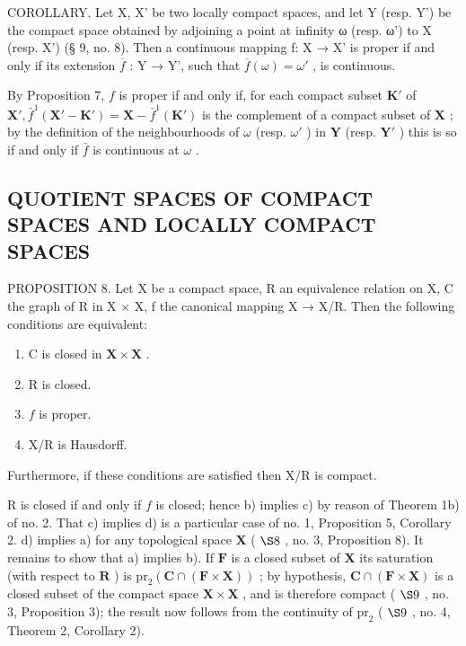 COROLLARY. Let X, X' be two locally compact spaces, and let Y (resp. Y') be the compact space obtained by adjoining a point at infinity ω (resp. ω') to X (resp. X') (§ 9, no. 8). Then a continuous mapping f: X → X' is proper if and only if its extension \(\overline{f}\) : Y → Y', such that \(\overline{f}(\omega) = \omega'\) , is continuous.

By Proposition 7, \(f\) is proper if and only if, for each compact subset \(\mathbf{K}'\) of \(\mathbf{X}', \bar{f}^1(\mathbf{X}' - \mathbf{K}') = \mathbf{X} - \bar{f}^1(\mathbf{K}')\) is the complement of a compact subset of \(\mathbf{X}\) ; by the definition of the neighbourhoods of \(\omega\) (resp. \(\omega'\) ) in \(\mathbf{Y}\) (resp. \(\mathbf{Y}'\) ) this is so if and only if \(\bar{f}\) is continuous at \(\omega\) .

\subsection{QUOTIENT SPACES OF COMPACT SPACES AND LOCALLY COMPACT SPACES}

PROPOSITION 8. Let X be a compact space, R an equivalence relation on X, C the graph of R in X × X, f the canonical mapping X → X/R. Then the following conditions are equivalent:

\begin{enumerate}
\def\labelenumi{\alph{enumi})}
\item
  C is closed in \(\mathbf{X} \times \mathbf{X}\) .
\item
  R is closed.
\item
  \(f\) is proper.
\item
  X/R is Hausdorff.
\end{enumerate}

Furthermore, if these conditions are satisfied then X/R is compact.

R is closed if and only if \(f\) is closed; hence b) implies c) by reason of Theorem 1b) of no. 2. That c) implies d) is a particular case of no. 1, Proposition 5, Corollary 2. d) implies a) for any topological space \(\mathbf{X}\) ( \(\S 8\) , no. 3, Proposition 8). It remains to show that a) implies b). If \(\mathbf{F}\) is a closed subset of \(\mathbf{X}\) its saturation (with respect to \(\mathbf{R}\) ) is \(\mathrm{pr}_2(\mathbf{C} \cap (\mathbf{F} \times \mathbf{X}))\) ; by hypothesis, \(\mathbf{C} \cap (\mathbf{F} \times \mathbf{X})\) is a closed subset of the compact space \(\mathbf{X} \times \mathbf{X}\) , and is therefore compact ( \(\S 9\) , no. 3, Proposition 3); the result now follows from the continuity of \(\mathrm{pr}_2\) ( \(\S 9\) , no. 4, Theorem 2, Corollary 2).

